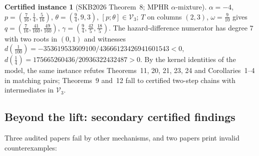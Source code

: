 \documentclass[10pt]{article}
\theoremstyle{plain}
\theoremstyle{definition}
\newtheorem{certificate}[theorem]{Certified instance}
\theoremstyle{remark}
\begin{document}
\begin{certificate}[SKB2026 Theorem~8; MPHR $\alpha$-mixture]\label{cer:skb}
$\alpha=-4$, $p=(\tfrac7{16},\tfrac14,\tfrac5{16})$, $\theta=(\tfrac94,9,3)$, $[p;\theta]\in\mathcal V_3$; $T$ on columns $(2,3)$, $\omega=\tfrac9{10}$ gives $q=(\tfrac7{16},\tfrac{41}{160},\tfrac{49}{160})$, $\gamma=(\tfrac94,\tfrac{42}5,\tfrac{18}5)$. The hazard-difference numerator has degree $7$ with two roots in $(0,1)$ and witnesses $d(\tfrac1{100})=-353619533609100/43666123426941601543<0$, $d(\tfrac14)=175665260436/20936322432487>0$. By the kernel identities of the model, the same instance refutes Theorems~11, 20, 21, 23, 24 and Corollaries~1--4 in matching pairs; Theorems~9 and~12 fall to certified two-step chains with intermediates in $\mathcal V_3$.
\end{certificate}

\subsection{Beyond the lift: secondary certified findings}\label{sec:secondary}

Three audited papers fail by other mechanisms, and two papers print invalid counterexamples:
\end{document}
